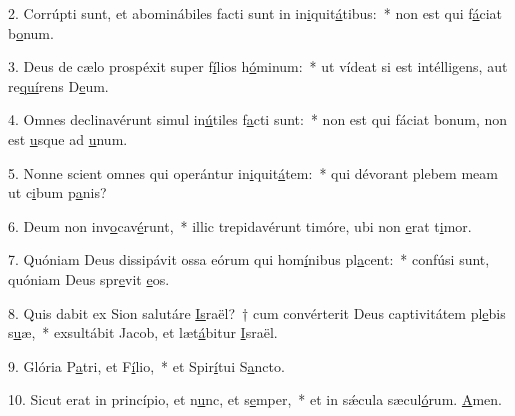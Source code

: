 2. Corrúpti sunt, et abominábiles facti sunt in in\uline{i}quit\uline{á}tibus:~* non est qui f\uline{á}ciat b\uline{o}num.\par 
3. Deus de cælo prospéxit super f\uline{í}lios h\uline{ó}minum:~* ut vídeat si est intélligens, aut re\uline{quí}rens D\uline{e}um.\par 
4. Omnes declinavérunt simul in\uline{ú}tiles f\uline{a}cti sunt:~* non est qui fáciat bonum, non est \uline{u}sque ad \uline{u}num.\par 
5. Nonne scient omnes qui operántur in\uline{i}quit\uline{á}tem:~* qui dévorant plebem meam ut c\uline{i}bum p\uline{a}nis?\par 
6. Deum non inv\uline{o}cav\uline{é}runt,~* illic trepidavérunt timóre, ubi non \uline{e}rat t\uline{i}mor.\par 
7. Quóniam Deus dissipávit ossa eórum qui hom\uline{í}nibus pl\uline{a}cent:~* confúsi sunt, quóniam Deus spr\uline{e}vit \uline{e}os.\par 
8. Quis dabit ex Sion salutáre \uline{Is}raël?~† cum convérterit Deus captivitátem pl\uline{e}bis s\uline{u}æ,~* exsultábit Jacob, et læt\uline{á}bitur \uline{I}sraël.\par 
9. Glória P\uline{a}tri, et F\uline{í}lio,~* et Spir\uline{í}tui S\uline{a}ncto.\par 
10. Sicut erat in princípio, et n\uline{u}nc, et s\uline{e}mper,~* et in sǽcula sæcul\uline{ó}rum. \uline{A}men.\par 
